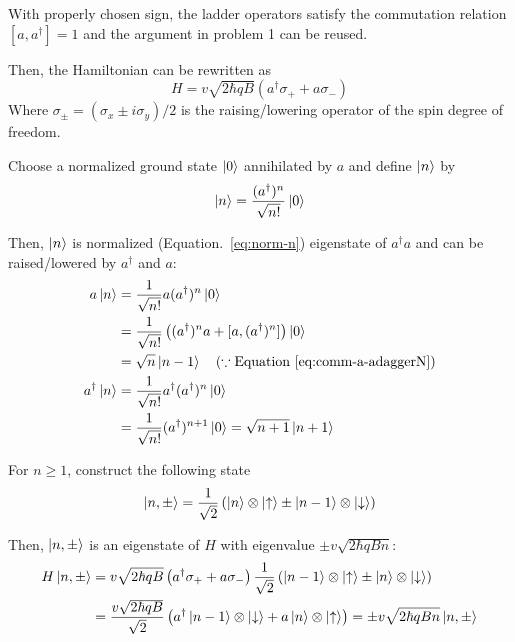 \documentclass[a4paper,11pt]{article}
\begin{document}
With properly chosen sign, the ladder operators satisfy the commutation relation $[a, a^\dagger] = 1$ and the argument in problem 1 can be reused.

Then, the Hamiltonian can be rewritten as
\begin{equation}
  H = v\sqrt{2\hbar qB} (a^\dagger \sigma_+ + a \sigma_-)
\end{equation}
Where $\sigma_\pm = (\sigma_x \pm i\sigma_y) / 2$ is the raising/lowering operator of the spin degree of freedom.

Choose a normalized ground state $\ket{0}$ annihilated by $a$ and define $\ket{n}$ by
\begin{equation}
  \ket{n} = \frac{(a^\dagger)^n}{\sqrt{n!}} \ket{0}
\end{equation}

Then, $\ket{n}$ is normalized (Equation.~\ref{eq:norm-n}) eigenstate of $a^\dagger a$ and can be raised/lowered by $a^\dagger$ and $a$:
\begin{align}
  a \ket{n} &= \frac{1}{\sqrt{n!}} a (a^\dagger)^n \ket{0}\\
  &= \frac{1}{\sqrt{n!}} \left( (a^\dagger)^n a + [a, (a^\dagger)^n] \right) \ket{0}\\
  &= \sqrt{n} \ket{n - 1} \quad (\because \text{Equation~\ref{eq:comm-a-adaggerN}})\\
  a^\dagger \ket{n} &= \frac{1}{\sqrt{n!}} a^\dagger (a^\dagger)^n \ket{0}\\
  &= \frac{1}{\sqrt{n!}} (a^\dagger)^{n + 1} \ket{0} = \sqrt{n + 1} \ket{n + 1}
\end{align}


For $n \geq 1$, construct the following state
\begin{equation}
  \ket{n, \pm} = \frac{1}{\sqrt{2}} \left( \ket{n} \otimes \ket{\uparrow} \pm \ket{n - 1} \otimes \ket{\downarrow} \right)
\end{equation}

Then, $\ket{n, \pm}$ is an eigenstate of $H$ with eigenvalue $\pm v\sqrt{2\hbar qBn}$:
\begin{align}
  H \ket{n, \pm} &= v\sqrt{2\hbar qB} \left( a^\dagger \sigma_+ + a \sigma_- \right) \frac{1}{\sqrt{2}} \left( \ket{n - 1} \otimes \ket{\uparrow} \pm \ket{n} \otimes \ket{\downarrow} \right) \\
  &= \frac{v\sqrt{2\hbar qB}}{\sqrt{2}} \left( a^\dagger \ket{n - 1} \otimes \ket{\downarrow} + a \ket{n} \otimes \ket{\uparrow} \right) = \pm v\sqrt{2\hbar qBn} \ket{n, \pm}
\end{align}
\end{document}
